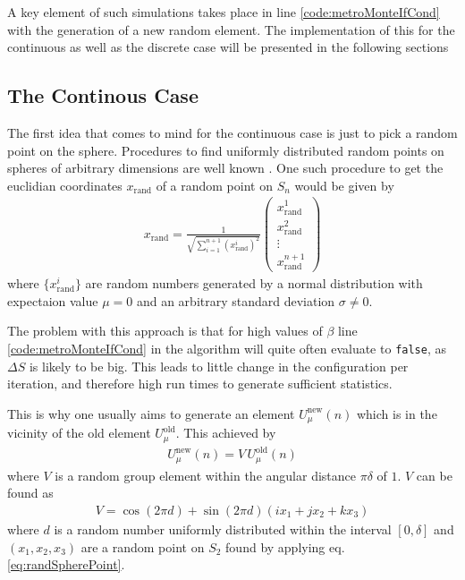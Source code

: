 A key element of such simulations takes place in line \ref{code:metroMonteIfCond} with the generation of a new random element. The implementation of this for the continuous as well as the discrete case will be presented in the following sections

\subsection{The Continous Case}
The first idea that comes to mind for the continuous case is just to pick a random point on the sphere. Procedures to find uniformly distributed random points on spheres of arbitrary dimensions are well known \cite{findsource}. One such procedure to get the euclidian coordinates $x_{\textrm{rand}}$ of a random point on $S_n$ would be given by
\begin{align}
 x_{\textrm{rand}} = \frac{1}{\sqrt{\sum_{i=1}^{n+1}(x^i_{\textrm{rand}})^2}} \begin{pmatrix}
  x^1_{\textrm{rand}} \\
  x^2_{\textrm{rand}} \\
  \vdots              \\
  x^{n+1}_{\textrm{rand}}
 \end{pmatrix}
 \label{eq:randSpherePoint}
\end{align}
where $\{x^i_{\textrm{rand}}\}$ are random numbers generated by a normal distribution with expectaion value $\mu = 0$ and an arbitrary standard deviation $\sigma \neq 0$.

The problem with this approach is that for high values of $\beta$ line \ref{code:metroMonteIfCond} in the algorithm will quite often evaluate to \texttt{false}, as $\Delta S$ is likely to be big. This leads to little change in the configuration per iteration, and therefore high run times to generate sufficient statistics.

This is why one usually aims to generate an element $U_\mu^{\textrm{new}}(n)$ which is in the vicinity of the old element $U_\mu^{\textrm{old}}$. This achieved by
\begin{align*}
 U_\mu^{\textrm{new}}(n) = V \, U_\mu^{\textrm{old}} (n)
\end{align*}
where $V$ is a random group element within the angular distance $\pi \delta$ of $1$. $V$ can be found as
\begin{align}
 V = \cos (2 \pi d ) + \sin (2 \pi d) \left(i x_1  + j x_2  + k x_3\right)
 \label{eq:transitionV}
\end{align}
where $d$ is a random number uniformly distributed within the interval $[0,\delta]$ and $(x_1,x_2,x_3)$ are a random point on $S_2$ found by applying eq. \ref{eq:randSpherePoint}.


